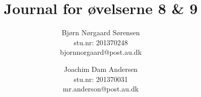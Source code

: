 

	\chead{\myTitle}	\rhead{\today}
\lfoot{}		\cfoot{}			\rfoot{\thepage}
\renewcommand{\headrulewidth}{1pt}
\renewcommand{\footrulewidth}{0pt}

\newcommand{\myTitle}{\textbf{Journal for øvelserne 8 \& 9}}

\title{\myTitle}
\author{
	Bjørn Nørgaard Sørensen\\
	stu.nr: 201370248\\
	bjornnorgaard@post.au.dk
	\and
	Joachim Dam Andersen\\
	stu.nr: 201370031\\
	mr.anderson@post.au.dk
}


	\maketitle
	\newpage
	
	
	\newpage
	
	\newpage
	

